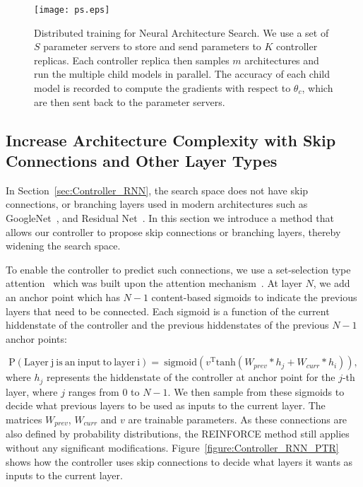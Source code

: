 \documentclass{article} \usepackage{iclr2017_conference,times}
\begin{document}
 \begin{figure}[h!]
\begin{center}
\centerline{\texttt{[image: ps.eps]}}
\caption{Distributed training for Neural Architecture Search. We use a set of $S$ parameter servers to store and send parameters to $K$ controller replicas. Each controller replica then samples $m$ architectures and run the multiple child models in parallel. The accuracy of each child model is recorded to compute the gradients with respect to $\theta_c$, which are then sent back to the parameter servers.}
\label{figure:Dist_Setup}
\end{center}
\end{figure}


\subsection{Increase Architecture Complexity with Skip Connections and Other Layer Types}
\label{sec:skip_connection}



In Section~\ref{sec:Controller_RNN}, 
the search space does not have skip connections, or branching layers used in modern architectures such as GoogleNet~\citep{szegedy2015going}, and Residual Net~\citep{he2015deep}. In this section we introduce a method that allows our controller to propose skip connections or branching layers, thereby widening the search space. 

To enable the controller to predict such connections, we use a set-selection type attention~\citep{neelakantan2015neural} which was built upon the attention mechanism~\citep{bahdanau2014neural,vinyals2015pointer}. At layer $N$, we add an anchor point which has $N-1$ content-based sigmoids to indicate the previous layers that need to be connected. Each sigmoid is a function of the current hiddenstate of the controller and the previous hiddenstates of the previous $N-1$ anchor points:

$$\mathrm{P(Layer \ j \ is \ an \ input \ to \ layer \ i) = \ } \mathrm{sigmoid}(v^\mathrm{T} \mathrm{tanh}(W_{prev}*h_{j} + W_{curr} * h_{i})), $$
 where $h_j$ represents the hiddenstate of the controller at anchor point for the $j$-th layer, where $j$ ranges from $0$ to $N-1$. We then sample from these sigmoids to decide what previous layers to be used as inputs to the current layer. The matrices $W_{prev}$,  $W_{curr}$ and $v$ are trainable parameters. As these connections are also defined by probability distributions, the REINFORCE method still applies without any significant modifications. 
Figure~\ref{figure:Controller_RNN_PTR} shows how the controller uses skip connections to decide what layers it wants as inputs to the current layer.
\end{document}
